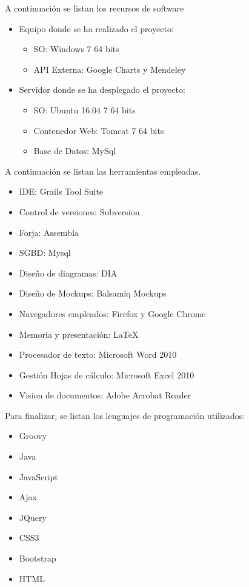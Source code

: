 A continuación se listan los recursos de software
\begin{itemize}
	\item Equipo donde se ha realizado el proyecto:
	
	\begin{itemize}
		\item SO: Windows 7 64 bits
		\item API Externa: Google Charts y Mendeley
	\end{itemize}
	
	\item Servidor donde se ha desplegado el proyecto:
	
	\begin{itemize}
		\item SO: Ubuntu 16.04 7 64 bits
		\item Contenedor Web: Tomcat 7 64 bits
		\item Base de Datos: MySql
	\end{itemize}
\end{itemize}

A continuación se listan las herramientas empleadas.\\
\begin{itemize}
	\item IDE: Grails Tool Suite
	\item Control de versiones: Subversion
	\item Forja: Assembla
	\item SGBD: Mysql
	\item Diseño de diagramas: DIA
	\item Diseño de Mockups: Balsamiq Mockups
	\item Navegadores empleados: Firefox y Google Chrome
	\item Memoria y presentación: \LaTeX
	\item Procesador de texto: Microsoft Word 2010
	\item Gestión Hojas de cálculo: Microsoft Excel 2010
	\item Vision de documentos: Adobe Acrobat Reader
\end{itemize}

Para finalizar, se listan los lenguajes de programación utilizados:\\
\begin{itemize}
	\item Groovy
	\item Java
	\item JavaScript
	\item Ajax
	\item JQuery
	\item CSS3
	\item Bootstrap
	\item HTML
\end{itemize}


